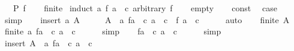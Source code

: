 \begin{isabellebody}
\ \ \ {\isachardoublequoteopen}P\ f{\isachardoublequoteclose}\isanewline
%
\isadelimproof
\ \ %
\endisadelimproof
%
\isatagproof
{}\isamarkupfalse%
\ finite\isanewline
{}\isamarkupfalse%
\ {\isacharparenleft}{\kern0pt}induct\ {\isachardoublequoteopen}{\isacharbraceleft}{\kern0pt}a{\isachardot}{\kern0pt}\ f\ a\ {\isasymnoteq}\ c{\isacharbraceright}{\kern0pt}{\isachardoublequoteclose}\ arbitrary{\isacharcolon}{\kern0pt}\ f{\isacharparenright}{\kern0pt}\isanewline
\ \ \isamarkupfalse%
\ empty\isanewline
\ \ \isamarkupfalse%
\ const\ \isamarkupfalse%
\ {\isacharquery}{\kern0pt}case\ \isamarkupfalse%
\ simp\isanewline
{}\isamarkupfalse%
\isanewline
\ \ \isamarkupfalse%
\ {\isacharparenleft}{\kern0pt}insert\ a\ A{\isacharparenright}{\kern0pt}\isanewline
\ \ \isamarkupfalse%
\ \isamarkupfalse%
\ {\isachardoublequoteopen}A\ {\isacharequal}{\kern0pt}\ {\isacharbraceleft}{\kern0pt}a{\isacharprime}{\kern0pt}{\isachardot}{\kern0pt}\ {\isacharparenleft}{\kern0pt}f{\isacharparenleft}{\kern0pt}a\ {\isacharcolon}{\kern0pt}{\isacharequal}{\kern0pt}\ c{\isacharparenright}{\kern0pt}{\isacharparenright}{\kern0pt}\ a{\isacharprime}{\kern0pt}\ {\isasymnoteq}\ c{\isacharbraceright}{\kern0pt}{\isachardoublequoteclose}\ \ {\isachardoublequoteopen}f\ a\ {\isasymnoteq}\ c{\isachardoublequoteclose}\isanewline
\ \ \ \ \isamarkupfalse%
\ auto\isanewline
\ \ \isamarkupfalse%
\ {\isacartoucheopen}finite\ A{\isacartoucheclose}\ \isamarkupfalse%
\ {\isachardoublequoteopen}finite\ {\isacharbraceleft}{\kern0pt}a{\isacharprime}{\kern0pt}{\isachardot}{\kern0pt}\ {\isacharparenleft}{\kern0pt}f{\isacharparenleft}{\kern0pt}a\ {\isacharcolon}{\kern0pt}{\isacharequal}{\kern0pt}\ c{\isacharparenright}{\kern0pt}{\isacharparenright}{\kern0pt}\ a{\isacharprime}{\kern0pt}\ {\isasymnoteq}\ c{\isacharbraceright}{\kern0pt}{\isachardoublequoteclose}\isanewline
\ \ \ \ \isamarkupfalse%
\ simp\isanewline
\ \ \isamarkupfalse%
\ {\isachardoublequoteopen}{\isacharparenleft}{\kern0pt}f{\isacharparenleft}{\kern0pt}a\ {\isacharcolon}{\kern0pt}{\isacharequal}{\kern0pt}\ c{\isacharparenright}{\kern0pt}{\isacharparenright}{\kern0pt}\ a\ {\isacharequal}{\kern0pt}\ c{\isachardoublequoteclose}\isanewline
\ \ \ \ \isamarkupfalse%
\ simp\isanewline
\ \ \isamarkupfalse%
\ insert\ {\isacartoucheopen}A\ {\isacharequal}{\kern0pt}\ {\isacharbraceleft}{\kern0pt}a{\isacharprime}{\kern0pt}{\isachardot}{\kern0pt}\ {\isacharparenleft}{\kern0pt}f{\isacharparenleft}{\kern0pt}a\ {\isacharcolon}{\kern0pt}{\isacharequal}{\kern0pt}\ c{\isacharparenright}{\kern0pt}{\isacharparenright}{\kern0pt}\ a{\isacharprime}{\kern0pt}\ {\isasymnoteq}\ c{\isacharbraceright}{\kern0pt}{\isacartoucheclose}\ \isamarkupfalse%

\end{isabellebody}
